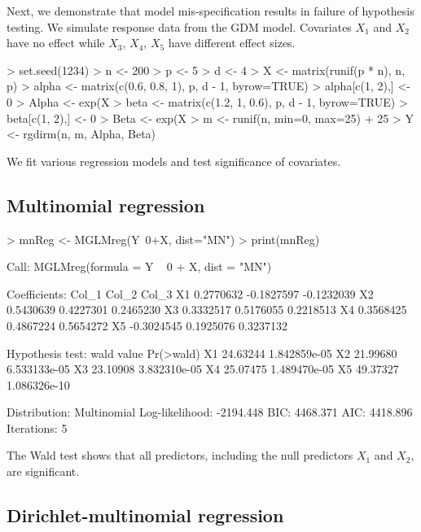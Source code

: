 \documentclass[a4paper]{article}
\begin{document}
Next, we demonstrate that model mis-specification results in failure of hypothesis testing.  We simulate response data from the GDM model. Covariates $X_1$ and $X_2$ have no effect while $X_3$, $X_4$, $X_5$ have different effect sizes. 
\begin{Schunk}
\begin{Sinput}
> set.seed(1234)
> n <- 200
> p <- 5
> d <- 4
> X <- matrix(runif(p * n), n, p)
> alpha <- matrix(c(0.6, 0.8, 1), p, d - 1, byrow=TRUE)
> alpha[c(1, 2),] <- 0
> Alpha <- exp(X %*% alpha)
> beta <- matrix(c(1.2, 1, 0.6), p, d - 1, byrow=TRUE)
> beta[c(1, 2),] <- 0
> Beta <- exp(X %*% beta)
> m <- runif(n, min=0, max=25) + 25
> Y <- rgdirm(n, m, Alpha, Beta)
\end{Sinput}
\end{Schunk}
We fit various regression models and test significance of covariates.

\subsection{Multinomial regression}

\begin{Schunk}
\begin{Sinput}
> mnReg <- MGLMreg(Y~0+X, dist="MN")
> print(mnReg)
\end{Sinput}
\begin{Soutput}
Call: MGLMreg(formula = Y ~ 0 + X, dist = "MN")

Coefficients:
        Col_1      Col_2      Col_3
X1  0.2770632 -0.1827597 -0.1232039
X2  0.5430639  0.4227301  0.2465230
X3  0.3332517  0.5176055  0.2218513
X4  0.3568425  0.4867224  0.5654272
X5 -0.3024545  0.1925076  0.3237132

Hypothesis test: 
   wald value    Pr(>wald)
X1   24.63244 1.842859e-05
X2   21.99680 6.533133e-05
X3   23.10908 3.832310e-05
X4   25.07475 1.489470e-05
X5   49.37327 1.086326e-10

Distribution: Multinomial
Log-likelihood: -2194.448
BIC: 4468.371
AIC: 4418.896
Iterations: 5
\end{Soutput}
\end{Schunk}
The Wald test shows that all predictors, including the null predictors $X_1$ and $X_2$, are significant.

\subsection{Dirichlet-multinomial regression}
\end{document}

